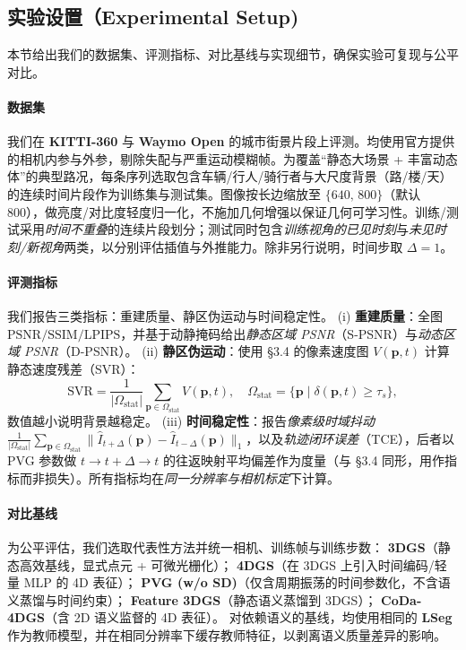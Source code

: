 \documentclass[10pt,conference]{IEEEtran} %
\begin{document}
\subsection{实验设置（Experimental Setup)}
本节给出我们的数据集、评测指标、对比基线与实现细节，确保实验可复现与公平对比。

\paragraph{数据集}
我们在 \textbf{KITTI\mbox{-}360} 与 \textbf{Waymo Open} 的城市街景片段上评测。均使用官方提供的相机内参与外参，剔除失配与严重运动模糊帧。为覆盖“静态大场景 + 丰富动态体”的典型路况，每条序列选取包含车辆/行人/骑行者与大尺度背景（路/楼/天）的连续时间片段作为训练集与测试集。图像按长边缩放至 \(\{640,\,800\}\)（默认 800），做亮度/对比度轻度归一化，不施加几何增强以保证几何可学习性。训练/测试采用\emph{时间不重叠}的连续片段划分；测试同时包含\emph{训练视角的已见时刻}与\emph{未见时刻/新视角}两类，以分别评估插值与外推能力。除非另行说明，时间步取 \(\Delta{=}1\)。

\paragraph{评测指标}
我们报告三类指标：重建质量、静区伪运动与时间稳定性。
(i) \textbf{重建质量}：全图 \(\mathrm{PSNR}/\mathrm{SSIM}/\mathrm{LPIPS}\)，并基于动静掩码给出\emph{静态区域 PSNR}（S\mbox{-}PSNR）与\emph{动态区域 PSNR}（D\mbox{-}PSNR）。
(ii) \textbf{静区伪运动}：使用 §3.4 的像素速度图 \(V(\mathbf p,t)\) 计算静态速度残差（SVR）：
\[
\mathrm{SVR}=\frac{1}{|\Omega_{\mathrm{stat}}|}\sum_{\mathbf p\in\Omega_{\mathrm{stat}}}V(\mathbf p,t),\quad
\Omega_{\mathrm{stat}}=\{\mathbf p\mid \delta(\mathbf p,t)\ge \tau_s\},
\]
数值越小说明背景越稳定。
(iii) \textbf{时间稳定性}：报告\emph{像素级时域抖动} \(\frac{1}{|\Omega_{\mathrm{stat}}|}\sum_{\mathbf p\in\Omega_{\mathrm{stat}}}\|\hat I_{t+\Delta}(\mathbf p)-\hat I_{t-\Delta}(\mathbf p)\|_1\)，以及\emph{轨迹闭环误差}（TCE），后者以 PVG 参数做 \(t\!\to\!t{+}\Delta\!\to\!t\) 的往返映射平均偏差作为度量（与 §3.4 同形，用作指标而非损失）。所有指标均在\emph{同一分辨率与相机标定}下计算。

\paragraph{对比基线}
为公平评估，我们选取代表性方法并统一相机、训练帧与训练步数：
\textbf{3DGS}（静态高效基线，显式点元 + 可微光栅化）；
\textbf{4DGS}（在 3DGS 上引入时间编码/轻量 MLP 的 4D 表征）；
\textbf{PVG (w/o SD)}（仅含周期振荡的时间参数化，不含语义蒸馏与时间约束）；
\textbf{Feature 3DGS}（静态语义蒸馏到 3DGS）；
\textbf{CoDa\mbox{-}4DGS}（含 2D 语义监督的 4D 表征）。
对依赖语义的基线，均使用相同的 \textbf{LSeg} 作为教师模型，并在相同分辨率下缓存教师特征，以剥离语义质量差异的影响。
\end{document}
